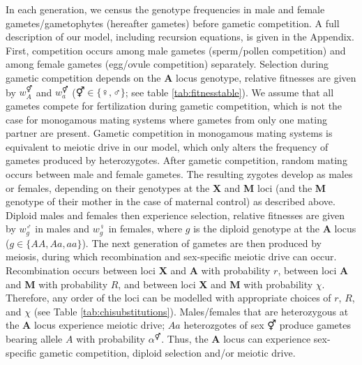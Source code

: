 \documentclass[12pt]{article}
\begin{document}
In each generation, we census the genotype frequencies in male and female gametes/gametophytes (hereafter gametes) before gametic competition. 
A full description of our model, including recursion equations, is given in the Appendix. 
First, competition occurs among male gametes (sperm/pollen competition) and among female gametes (egg/ovule competition) separately. 
Selection during gametic competition depends on the \textbf{A} locus genotype, relative fitnesses are given by $w_A^\Hermaphrodite$ and $w_a^\Hermaphrodite$ ($\Hermaphrodite \in \{\female,\male\}$; see table \ref{tab:fitnesstable}). %
We assume that all gametes compete for fertilization during gametic competition, which is not the case for monogamous mating systems where gametes from only one mating partner are present. 
Gametic competition in monogamous mating systems is equivalent to meiotic drive in our model, which only alters the frequency of gametes produced by heterozygotes. 
After gametic competition, random mating occurs between male and female gametes.
The resulting zygotes develop as males or females, depending on their genotypes at the \textbf{X} and \textbf{M} loci (and the \textbf{M} genotype of their mother in the case of maternal control) as described above.
Diploid males and females then experience selection, relative fitnesses are given by $w_{g}^{\male}$ in males and $w_{g}^{\female}$ in females, where $g$ is the diploid genotype at the \textbf{A} locus ($g \in \{AA, Aa, aa\}$).  
The next generation of gametes are then produced by meiosis, during which recombination and sex-specific meiotic drive can occur. 
Recombination occurs between loci \textbf{X} and \textbf{A} with probability $r$, between loci \textbf{A} and \textbf{M} with probability $R$, and between loci \textbf{X} and \textbf{M} with probability $\chi$.
Therefore, any order of the loci can be modelled with appropriate choices of $r$, $R$, and $\chi$ (see Table \ref{tab:chisubstitutions}). 
Males/females that are heterozygous at the \textbf{A} locus experience meiotic drive; $Aa$ heterozgotes of sex $\Hermaphrodite$ produce gametes bearing allele $A$ with probability $\alpha^\Hermaphrodite$. 
Thus, the \textbf{A} locus can experience sex-specific gametic competition, diploid selection and/or meiotic drive. 
\end{document}
